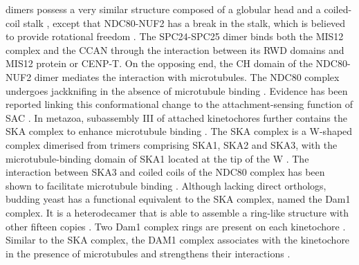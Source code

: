 dimers possess a very similar structure composed of a globular head and a coiled-coil stalk \citep{Wei2006StructureDomain, Wei2005MolecularComponent, Wei2006TheAttachment, Ciferri2005ArchitectureKinetochore, Ciferri2008ImplicationsComplex}, except that NDC80-NUF2 has a break in the stalk, which is believed to provide rotational freedom \citep{Tang2013Ndc80Motif}. The SPC24-SPC25 dimer binds both the MIS12 complex and the CCAN through the interaction between its RWD domains and MIS12 protein or CENP-T. On the opposing end, the CH domain of the NDC80-NUF2 dimer mediates the interaction with microtubules. The NDC80 complex undergoes jackknifing in the absence of microtubule binding \citep{Roscioli2020, Scarborough2019TightMicrotubules}. Evidence has been reported linking this conformational change to the attachment-sensing function of SAC \citep{Wan2009ProteinSite, Aravamudhan2015TheSignalling}. In metazoa, subassembly III of attached kinetochores further contains the SKA complex to enhance microtubule binding \citep{Welburn2009TheMotility, Gaitanos2009StableSka3/C13Orf3, Theis2009ComparativeDivision}. The SKA complex is a W-shaped complex dimerised from trimers comprising SKA1, SKA2 and SKA3, with the microtubule-binding domain of SKA1 located at the tip of the W \citep{Abad2014StructuralComplex, Jeyaprakash2012StructuralInterface, Schmidt2012TheProtofilaments}. The interaction between SKA3 and coiled coils of the NDC80 complex has been shown to facilitate microtubule binding \citep{Abad2016Ska3Domain, Chan2012AuroraInteraction, Helgeson2018HumanAttachments, Zhang2017Ska3Progression}. Although lacking direct orthologs, budding yeast has a functional equivalent to the SKA complex, named the Dam1 complex. It is a heterodecamer that is able to assemble a ring-like structure with other fifteen copies \citep{Jenni2018StructureInterface, Miranda2005TheMicrotubules, Ramey2011TheMicrotubule, Westermann2005FormationComplex}. Two Dam1 complex rings are present on each kinetochore \citep{Kim2017TheRings}. Similar to the SKA complex, the DAM1 complex associates with the kinetochore in the presence of microtubules \citep{Li2002TheKinetochore} and strengthens their interactions \citep{Lampert2013MolecularComplexes, Lampert2010TheComplex, Tien2010CooperationB}. 

